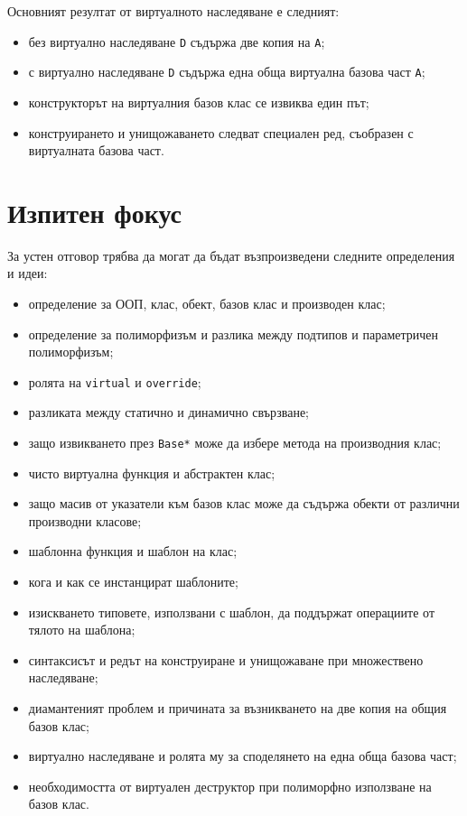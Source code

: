 Основният резултат от виртуалното наследяване е следният:

\begin{itemize}
    \item без виртуално наследяване \texttt{D} съдържа две копия на \texttt{A};
    \item с виртуално наследяване \texttt{D} съдържа една обща виртуална базова част \texttt{A};
    \item конструкторът на виртуалния базов клас се извиква един път;
    \item конструирането и унищожаването следват специален ред, съобразен с виртуалната базова част.
\end{itemize}

\section{Изпитен фокус}\label{s:17.7}

За устен отговор трябва да могат да бъдат възпроизведени следните определения и идеи:

\begin{itemize}
    \item определение за ООП, клас, обект, базов клас и производен клас;
    \item определение за полиморфизъм и разлика между подтипов и параметричен полиморфизъм;
    \item ролята на \texttt{virtual} и \texttt{override};
    \item разликата между статично и динамично свързване;
    \item защо извикването през \texttt{Base*} може да избере метода на производния клас;
    \item чисто виртуална функция и абстрактен клас;
    \item защо масив от указатели към базов клас може да съдържа обекти от различни производни класове;
    \item шаблонна функция и шаблон на клас;
    \item кога и как се инстанцират шаблоните;
    \item изискването типовете, използвани с шаблон, да поддържат операциите от тялото на шаблона;
    \item синтаксисът и редът на конструиране и унищожаване при множествено наследяване;
    \item диамантеният проблем и причината за възникването на две копия на общия базов клас;
    \item виртуално наследяване и ролята му за споделянето на една обща базова част;
    \item необходимостта от виртуален деструктор при полиморфно използване на базов клас.
\end{itemize}
